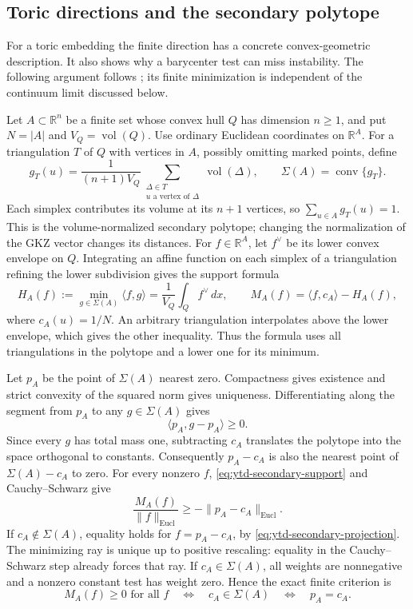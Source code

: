 \subsection{Toric directions and the secondary polytope}
\label{sec:ytd-toric-secondary-polytope}

For a toric embedding the finite direction has a concrete convex-geometric
description. It also shows why a barycenter test can miss instability.
The following argument follows
\cite[\S3.1--3.4 and Appendix~B]{LSY26SecondaryPolytopesV1};
its finite minimization is independent of the continuum limit discussed
below.

Let $A\subset\mathbb R^n$ be a finite set whose convex hull $Q$ has
dimension $n\geq1$, and put $N=|A|$ and $V_Q=\operatorname{vol}(Q)$.
Use ordinary Euclidean coordinates on $\mathbb R^A$. For a triangulation
$T$ of $Q$ with vertices in $A$, possibly omitting marked points, define
\[
 g_T(u)=\frac{1}{(n+1)V_Q}
       \sum_{\substack{\Delta\in T\\u\text{ a vertex of }\Delta}}
                  \operatorname{vol}(\Delta),
 \qquad
 \Sigma(A)=\operatorname{conv}\{g_T\}.
\]
Each simplex contributes its volume at its $n+1$ vertices, so
$\sum_{u\in A}g_T(u)=1$. This is the volume-normalized secondary polytope;
changing the normalization of the GKZ vector changes its distances.
For $f\in\mathbb R^A$, let $f^\vee$ be its lower convex envelope on $Q$.
Integrating an affine function on each simplex of a triangulation
refining the lower subdivision gives the support formula
\[
 H_A(f):=\min_{g\in\Sigma(A)}\langle f,g\rangle
       =\frac{1}{V_Q}\int_Q f^\vee\,dx,
 \qquad
 M_A(f)=\langle f,c_A\rangle-H_A(f),
 \tag{68.23cs}\label{eq:ytd-secondary-support}
\]
where $c_A(u)=1/N$. An arbitrary triangulation interpolates above the
lower envelope, which gives the other inequality. Thus the formula uses
all triangulations in the polytope and a lower one for its minimum.

Let $p_A$ be the point of $\Sigma(A)$ nearest zero. Compactness gives
existence and strict convexity of the squared norm gives uniqueness.
Differentiating along the segment from $p_A$ to any $g\in\Sigma(A)$ gives
\[
 \langle p_A,g-p_A\rangle\geq0.
 \tag{68.23ct}\label{eq:ytd-secondary-projection}
\]
Since every $g$ has total mass one, subtracting $c_A$ translates the
polytope into the space orthogonal to constants. Consequently $p_A-c_A$
is also the nearest point of $\Sigma(A)-c_A$ to zero.
For every nonzero $f$, \eqref{eq:ytd-secondary-support} and
Cauchy--Schwarz give
\[
 \frac{M_A(f)}{\|f\|_{\mathrm{Eucl}}}
 \geq-\|p_A-c_A\|_{\mathrm{Eucl}}.
\]
If $c_A\notin\Sigma(A)$, equality holds for $f=p_A-c_A$, by
\eqref{eq:ytd-secondary-projection}. The minimizing ray is unique up
to positive rescaling: equality in the Cauchy--Schwarz step already
forces that ray. If $c_A\in\Sigma(A)$, all weights are nonnegative
and a nonzero constant test has weight zero. Hence the exact finite
criterion is
\[
 M_A(f)\geq0\text{ for all }f
 \quad\Longleftrightarrow\quad
 c_A\in\Sigma(A)
 \quad\Longleftrightarrow\quad p_A=c_A.
 \tag{68.23cu}\label{eq:ytd-secondary-membership}
\]

